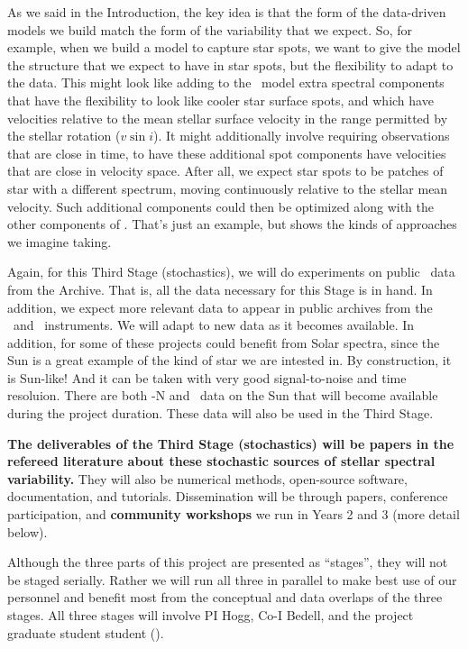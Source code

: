 \documentclass[12pt, letterpaper]{article}
\begin{document}
As we said in the Introduction, the key idea is that the form of the
data-driven models we build match the form of the variability that
we expect.
So, for example, when we build a model to capture star spots, we want
to give the model the structure that we expect to have in star spots,
but the flexibility to adapt to the data.
This might look like adding to the \wobble\ model extra spectral
components that have the flexibility to look like cooler star surface
spots, and which have velocities relative to the mean stellar surface
velocity in the range permitted by the stellar rotation ($v\sin i$).
It might additionally involve requiring observations that are close
in time, to have these additional spot components have velocities that
are close in velocity space.
After all, we expect star spots to be patches of star with a different
spectrum, moving continuously relative to the stellar mean velocity.
Such additional components could then be optimized along with the other
components of \wobble.
That's just an example, but shows the kinds of approaches we imagine taking.

Again, for this Third Stage (stochastics), we will do experiments on
public \HARPS\ data from the Archive.
That is, all the data necessary for this Stage is in hand.
In addition, we expect more relevant data to appear in public archives
from the \ESPRESSO\ and \NEID\ instruments.
We will adapt to new data as it becomes available.
In addition, for some of these projects could benefit from Solar
spectra, since the Sun is a great example of the kind of star we are
intested in.
By construction, it is Sun-like!
And it can be taken with very good signal-to-noise and time resoluion.
There are both \HARPS-N and \HARPS\ data on the Sun that will become
available during the project duration.
These data will also be used in the Third Stage.

\textbf{The deliverables of the Third Stage (stochastics) will be papers in the
refereed literature about these stochastic sources of stellar spectral
variability.}
They will also be numerical methods, open-source software, documentation,
and tutorials.
Dissemination will be through papers, conference participation, and
\textbf{community workshops} we run in Years 2 and 3 (more detail below).


Although the three parts of this project are presented as ``stages'',
they will not be staged serially.
Rather we will run all three in parallel to make best use of our
personnel and benefit most from the conceptual and data overlaps of the three stages.
All three stages will involve PI Hogg, Co-I Bedell, and the project
graduate student student (\GRA). 
\end{document}
